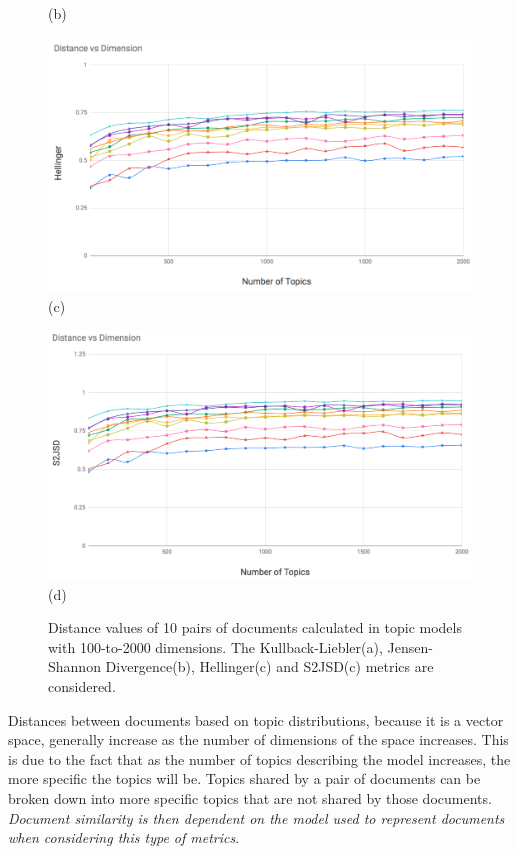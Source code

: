 \begin{figure}
\begin{center}
\begin{adjustbox}{minipage=0.50\linewidth,frame=0pt 3pt}
\centering (b)
\end{adjustbox}
\hfill
\begin{adjustbox}{minipage=0.50\linewidth,frame=0pt 3pt}
\includegraphics[width=\linewidth]{He_100_2k.png}
\centering (c)
\end{adjustbox}
\hfill
\begin{adjustbox}{minipage=0.50\linewidth,frame=0pt 3pt}
\includegraphics[width=\linewidth]{S2JSD_100_2k.png}
\centering (d)
\end{adjustbox}
\end{center}
\caption{Distance values of 10 pairs of documents calculated in topic models with 100-to-2000 dimensions. The Kullback-Liebler(a), Jensen-Shannon Divergence(b), Hellinger(c) and S2JSD(c) metrics are considered.}
\label{fig:topic_distances}
\end{figure}

Distances between documents based on topic distributions, because it is a vector space, generally increase as the number of dimensions of the space increases. This is due to the fact that as the number of topics describing the model increases, the more specific the topics will be. Topics shared by a pair of documents can be broken down into more specific topics that are not shared by those documents. \textit{Document similarity is then dependent on the model used to represent documents when considering this type of metrics}. 

